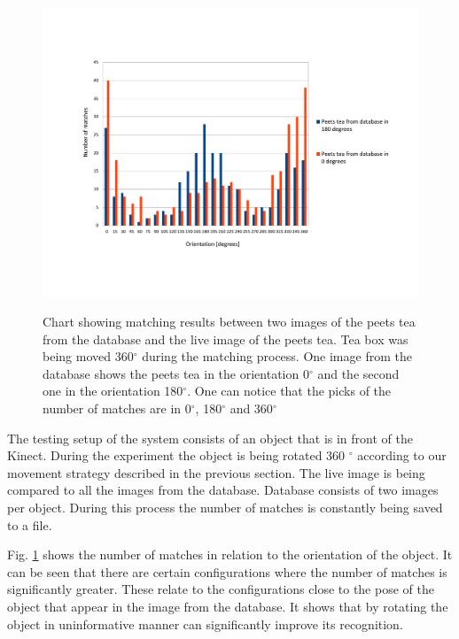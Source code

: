 \begin{figure}

\includegraphics[width=1.5\columnwidth]{figures/print.pdf}\\


\caption{Chart showing matching results between two images of the peets tea from the database and the live image of the peets tea. Tea box was being moved 360$^\circ$ during the matching process. One image from the database shows the peets tea in the orientation 0$^\circ$ and the second one in the orientation 180$^\circ$. One can notice that the picks of the number of matches are in 0$^\circ$, 180$^\circ$ and 360$^\circ$}
\label{fig:recognition-results}
\end{figure}
The testing setup of the system consists of an object that is in front of the Kinect. During the experiment the object is being rotated 360 $^\circ$ according to our movement strategy described in the previous section. The live image is being compared to all the images from the database. Database consists of two images per object. During this process the number of matches is constantly being saved to a file.

Fig. \ref{fig:recognition-results} shows the number of matches in relation to the orientation of the object. It can be seen that there are certain configurations where the number of matches is significantly greater. These relate to the configurations close to the pose of the object that appear in the image from the database. It shows that by rotating the object in uninformative manner can significantly improve its recognition. 

